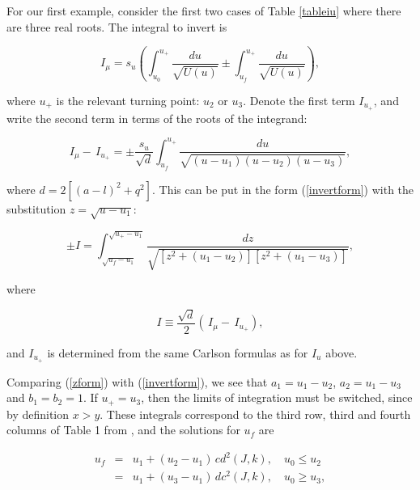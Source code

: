 \documentclass[apj]{emulateapj}
\begin{document}
For our first example, consider the first two cases of Table \ref{tableiu} where there are three real roots. The integral to invert is 

\begin{equation}\label{rtp}
  I_\mu = s_u\left (\int_{u_0}^{u_+} \frac{du}{\sqrt{U(u)}} \pm \int_{u_f}^{u_+} \frac{du}{\sqrt{U(u)}}\right ),
\end{equation}

\noindent where $u_+$ is the relevant turning point: $u_2$ or $u_3$. Denote the first term $I_{u_+}$, and write the second term in terms of the roots of the integrand:

\begin{equation}
I_\mu - \hspace{2pt}I_{u_+} = \pm \frac{s_u}{\sqrt{d}}\int_{u_f}^{u_+} \frac{du}{\sqrt{(u-u_1)(u-u_2)(u-u_3)}},
\end{equation}

\noindent where $d=2[(a-l)^2+q^2]$. This can be put in the form (\ref{invertform}) with the substitution $z = \sqrt{u-u_1}$:

\begin{equation}\label{zform}
\pm I = \int_{\sqrt{u_f-u_1}}^{\sqrt{u_+-u_1}} \frac{dz}{\sqrt{[z^2+(u_1-u_2)][z^2+(u_1-u_3)]}},
\end{equation}

\noindent where 

\begin{equation}
I \equiv \frac{\sqrt{d}}{2}\left ( \hspace{2pt}I_\mu - \hspace{2pt}I_{u_+} \right),
\end{equation}

\noindent and $I_{u_+}$ is determined from the same Carlson formulas as for $I_u$ above. 

Comparing (\ref{zform}) with (\ref{invertform}), we see that $a_1 = u_1-u_2$, $a_2 = u_1-u_3$ and $b_1 = b_2 = 1$. If $u_+ = u_3$, then the limits of integration must be switched, since by definition $x > y$. These integrals correspond to the third row, third and fourth columns of Table 1 from \citet{carlson2005}, and the solutions for $u_f$ are

\begin{eqnarray}
  u_f &=& u_1 + (u_2-u_1)\hspace{2pt} cd^2(J,k), \hspace{12pt} u_0 \le u_2 \\
      &=& u_1 + (u_3-u_1)\hspace{2pt} dc^2(J,k), \hspace{12pt} u_0 \ge u_3,
\end{eqnarray}
\end{document}
